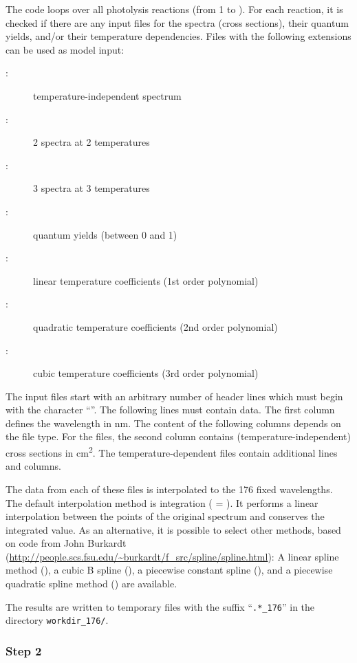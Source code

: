 \documentclass[a4paper,twoside]{article}
\begin{document}
The code loops over all photolysis reactions (from 1 to ).
For each reaction, it is checked if there are any input files for the
spectra (cross sections), their quantum yields, and/or their temperature
dependencies. Files with the following extensions can be used as model
input:

\begin{description}
\item [:] temperature-independent spectrum
\item [:] 2 spectra at 2 temperatures
\item [:] 3 spectra at 3 temperatures
\item [:] quantum yields (between 0 and 1)
\item [:] linear temperature coefficients (1st order
  polynomial)
\item [:] quadratic temperature coefficients (2nd order
  polynomial)
\item [:] cubic temperature coefficients (3rd order
  polynomial)
\end{description}

The input files start with an arbitrary number of header lines which
must begin with the character ``\code{#}''. The following lines must
contain data. The first column defines the wavelength in \unit{nm}. The
content of the following columns depends on the file type. For the
 files, the second column contains (temperature-independent)
cross sections in \unit{cm^2}. The temperature-dependent files contain
additional lines and columns.

The data from each of these files is interpolated to the 176 fixed
wavelengths. The default interpolation method is integration
( = ). It performs a linear
interpolation between the points of the original spectrum and conserves
the integrated value. As an alternative, it is possible to select other
methods, based on code from John Burkardt
(\url{http://people.scs.fsu.edu/~burkardt/f_src/spline/spline.html}): A
linear spline method (), a cubic B spline
(), a piecewise constant spline (), and a
piecewise quadratic spline method () are available.

The results are written to temporary files with the suffix
``\verb|.*_176|'' in the directory \verb|workdir_176/|.

\subsubsection{Step 2}
\end{document}
